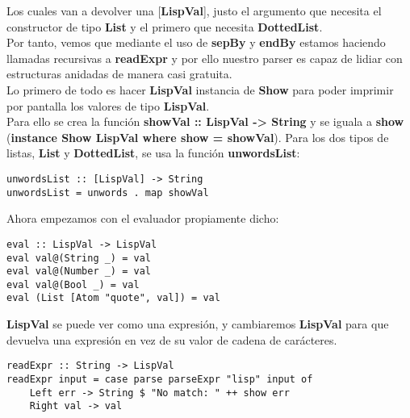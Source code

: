 Los cuales van a devolver una [\textbf{LispVal}], justo el argumento que necesita el constructor de tipo \textbf{List} y el primero que necesita \textbf{DottedList}.\\

Por tanto, vemos que mediante el uso de \textbf{sepBy} y \textbf{endBy} estamos haciendo llamadas recursivas a \textbf{readExpr} y por ello nuestro parser es capaz de lidiar con estructuras anidadas de manera casi gratuita.\\

Lo primero de todo es hacer \textbf{LispVal} instancia de \textbf{Show} para poder imprimir por pantalla los valores de tipo \textbf{LispVal}.\\

Para ello se crea la funci\'on \textbf{showVal :: LispVal -> String} y se iguala a \textbf{show} (\textbf{instance Show \textbf{LispVal} where show = showVal}). Para los dos tipos de listas, \textbf{List} y \textbf{DottedList}, se usa la funci\'on \textbf{unwordsList}:\\

\begin{minipage}{\linewidth}
\begin{small}
\begin{lstlisting}[frame=single]
unwordsList :: [LispVal] -> String
unwordsList = unwords . map showVal
\end{lstlisting}
\end{small}
\end{minipage}

Ahora empezamos con el evaluador propiamente dicho:\\

\begin{minipage}{\linewidth}
\begin{small}
\begin{lstlisting}[frame=single]
eval :: LispVal -> LispVal
eval val@(String _) = val
eval val@(Number _) = val
eval val@(Bool _) = val
eval (List [Atom "quote", val]) = val
\end{lstlisting}
\end{small}
\end{minipage}

\textbf{LispVal} se puede ver como una expresi\'on, y cambiaremos \textbf{LispVal} para que devuelva una expresi\'on en vez de su valor de cadena de car\'acteres.\\

\begin{minipage}{\linewidth}
\begin{small}
\begin{lstlisting}[frame=single]
readExpr :: String -> LispVal
readExpr input = case parse parseExpr "lisp" input of
    Left err -> String $ "No match: " ++ show err
    Right val -> val
\end{lstlisting}
\end{small}
\end{minipage}

